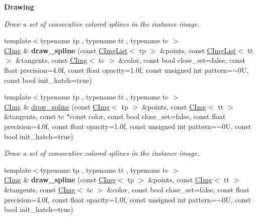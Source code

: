 \begin{Indent}{\bf Drawing}
\begin{DoxyCompactItemize}
\begin{DoxyCompactList}\small\item\em Draw a set of consecutive colored splines in the instance image. \end{DoxyCompactList}\item 
\hypertarget{structcimg__library_1_1_c_img_a7a3655307f056a7078c8a25485a96891}{{\footnotesize template$<$typename tp , typename tt , typename tc $>$ }\\\hyperlink{structcimg__library_1_1_c_img}{C\-Img} \& {\bfseries draw\-\_\-spline} (const \hyperlink{structcimg__library_1_1_c_img_list}{C\-Img\-List}$<$ tp $>$ \&points, const \hyperlink{structcimg__library_1_1_c_img_list}{C\-Img\-List}$<$ tt $>$ \&tangents, const \hyperlink{structcimg__library_1_1_c_img}{C\-Img}$<$ tc $>$ \&color, const bool close\-\_\-set=false, const float precision=4.\-0f, const float opacity=1.\-0f, const unsigned int pattern=$\sim$0\-U, const bool init\-\_\-hatch=true)}\label{structcimg__library_1_1_c_img_a7a3655307f056a7078c8a25485a96891}

\item 
\hypertarget{structcimg__library_1_1_c_img_a4135a3155e45344320abf20a2e5f5f08}{{\footnotesize template$<$typename tp , typename tt , typename tc $>$ }\\\hyperlink{structcimg__library_1_1_c_img}{C\-Img} \& \hyperlink{structcimg__library_1_1_c_img_a4135a3155e45344320abf20a2e5f5f08}{draw\-\_\-spline} (const \hyperlink{structcimg__library_1_1_c_img}{C\-Img}$<$ tp $>$ \&points, const \hyperlink{structcimg__library_1_1_c_img}{C\-Img}$<$ tt $>$ \&tangents, const tc $\ast$const color, const bool close\-\_\-set=false, const float precision=4.\-0f, const float opacity=1.\-0f, const unsigned int pattern=$\sim$0\-U, const bool init\-\_\-hatch=true)}\label{structcimg__library_1_1_c_img_a4135a3155e45344320abf20a2e5f5f08}

\begin{DoxyCompactList}\small\item\em Draw a set of consecutive colored splines in the instance image. \end{DoxyCompactList}\item 
\hypertarget{structcimg__library_1_1_c_img_a2c521a8ce95b6ac4bed5c3b5fd53c855}{{\footnotesize template$<$typename tp , typename tt , typename tc $>$ }\\\hyperlink{structcimg__library_1_1_c_img}{C\-Img} \& {\bfseries draw\-\_\-spline} (const \hyperlink{structcimg__library_1_1_c_img}{C\-Img}$<$ tp $>$ \&points, const \hyperlink{structcimg__library_1_1_c_img}{C\-Img}$<$ tt $>$ \&tangents, const \hyperlink{structcimg__library_1_1_c_img}{C\-Img}$<$ tc $>$ \&color, const bool close\-\_\-set=false, const float precision=4.\-0f, const float opacity=1.\-0f, const unsigned int pattern=$\sim$0\-U, const bool init\-\_\-hatch=true)}\label{structcimg__library_1_1_c_img_a2c521a8ce95b6ac4bed5c3b5fd53c855}


\end{DoxyCompactItemize}
\end{Indent}
